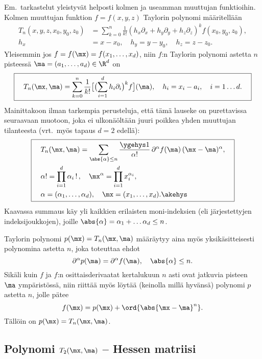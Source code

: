 Em.\ tarkastelut yleistyvät helposti kolmen ja useamman muuttujan funktioihin. Kolmen muuttujan
funktion $f=f(x,y,z)$ Taylorin polynomi määritellään
\begin{align*}
T_n(x,y,z,x_0,y_0,z_0) 
    &= \sum_{k=0}^n \frac{1}{k!}(h_x\partial_x+h_y\partial_y+h_z\partial_z)^kf(x_0,y_0,z_0), \\
h_x &= x-x_0,\quad h_y=y-y_0,\quad h_z=z-z_0.
\end{align*}
Yleisemmin jos $f=f(\mx)=f(x_1,\ldots,x_d)$, niin $f$:n Taylorin polynomi astetta $n$ pisteessä 
$\ma=(a_1,\ldots,a_d)\in\R^d$ on
\[ \boxed{
\quad T_n(\mx,\ma)
  =\sum_{k=0}^n\frac{1}{k!}\bigl[\bigl(\sum_{i=1}^d h_i\partial_i\bigr)^kf\bigr](\ma),\quad
                               h_i=x_i-a_i,\quad i=1\ldots d. \quad}
\]
Mainittakoon ilman tarkempia perusteluja, että tämä lauseke on purettavissa seuraavaan muotoon,
joka ei ulkonäöltään juuri poikkea yhden muuttujan tilanteesta
(vrt.\ myös tapaus $d=2$ edellä):
\[ \boxed{ \begin{aligned}
\quad &T_n(\mx,\ma)=\sum_{\abs{\alpha}\le n}\frac{\ygehys 1}{\alpha !}\,
                             \partial^\alpha f(\ma)\,(\mx-\ma)^\alpha, \quad \\
      &\alpha ! = \prod_{i=1}^d \alpha_i\,!\,, \quad 
                  \mx^\alpha = \prod_{i=1}^d x_i^{\alpha_i}, \\
      &\alpha   = (\alpha_1, \ldots, \alpha_d), \quad \mx = (x_1, \ldots, x_d). \akehys
\end{aligned} } \]
Kaavassa summaus käy yli kaikkien erilaisten moni-indeksien 
(eli järjestettyjen indeksijoukkojen), joille $\abs{\alpha} = \alpha_1 + \ldots \alpha_d \le n$.

Taylorin polynomi  $p(\mx)=T_n(\mx,\ma)$ määräytyy aina myös yksikäsitteisesti polynomina 
astetta $n$, joka toteuttaa ehdot
\[
\partial^\alpha p(\ma)=\partial^\alpha f(\ma),\quad \abs{\alpha}\leq n.
\]
Sikäli kuin $f$ ja $f$:n osittaisderivaatat kertalukuun $n$ asti ovat jatkuvia pisteen $\ma$
ympäristössä, niin riittää myös löytää (keinolla millä hyvänsä) polynomi $p$ astetta $n$,
jolle pätee
\[ 
f(\mx) = p(\mx) + \ord{\abs{\mx-\ma}^n}.
\]
Tällöin on $p(\mx)=T_n(\mx,\ma)$.

\subsection{Polynomi $T_2(\mx,\ma)$ -- Hessen matriisi}

